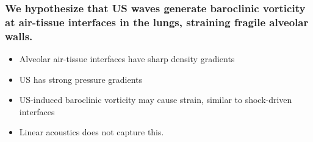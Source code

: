 \begin{frame} \frametitle{We hypothesize that US waves generate baroclinic vorticity at air-tissue interfaces in the lungs, straining fragile alveolar walls.}%
  \vfill 
  \begin{minipage}{\textwidth}
    \begin{minipage}{0.5\textwidth}
      {\footnotesize
        \begin{itemize}%
        \item Alveolar air-tissue interfaces have sharp density gradients%
          \vspace*{6pt}%
        \item US has strong pressure gradients%
          \vspace*{6pt}%
        \item US-induced baroclinic vorticity may cause strain, similar to shock-driven interfaces%
          \vspace*{6pt}%
        \item Linear acoustics does not capture this.
        \end{itemize}
      }
    \end{minipage}
    \begin{minipage}{0.5\textwidth}
      \begin{figure}
        \centering
\end{figure}
\end{minipage}
\end{minipage}
\end{frame}
